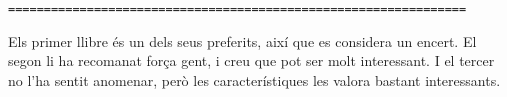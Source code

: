 \begin{verbatim}
================================================================
\end{verbatim}

Els primer llibre és un dels seus preferits, així que es considera un encert. El segon li ha recomanat força gent, i creu que pot ser molt interessant. I el tercer no l'ha sentit anomenar, però les característiques les valora bastant interessants.
